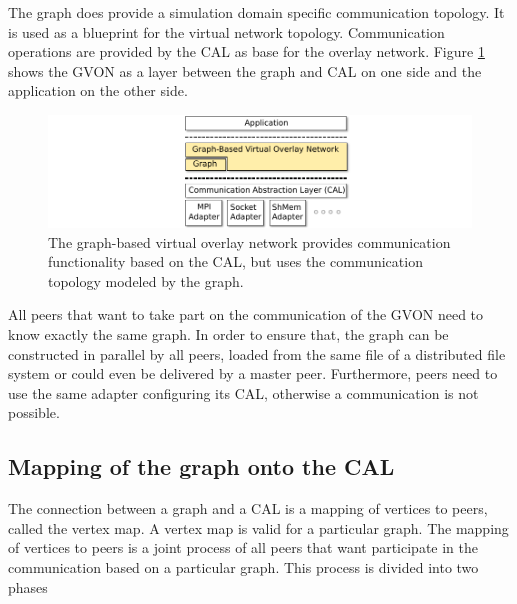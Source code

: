 The graph does provide a simulation domain specific communication
topology.  It is used as a blueprint for the virtual network topology.
Communication operations are provided by the CAL as base for the
overlay network.  Figure \ref{fig:gvon} shows the GVON as a layer
between the graph and CAL on one side and the application on the other
side.

\begin{figure}[H]
  \centering \includegraphics[width=\textwidth]{graphics/30_gvon}
  \caption{The graph-based virtual overlay network provides
    communication functionality based on the CAL, but uses the
    communication topology modeled by the graph.}
  \label{fig:gvon}
\end{figure}

All peers that want to take part on the communication of the GVON need
to know exactly the same graph. In order to ensure that, the graph can be
constructed in parallel by all peers, loaded from the same file of a
distributed file system or could even be delivered by a master
peer. Furthermore, peers need to use the same adapter configuring its
CAL, otherwise a communication is not possible.


\subsection{Mapping of the graph onto the CAL}
\label{sec:mapping}
The connection between a graph and a CAL is a mapping of vertices to
peers, called the vertex map.  A vertex map is valid for a particular
graph. The mapping of vertices to peers is a joint process of all
peers that want participate in the communication based on a particular
graph. This process is divided into two phases

